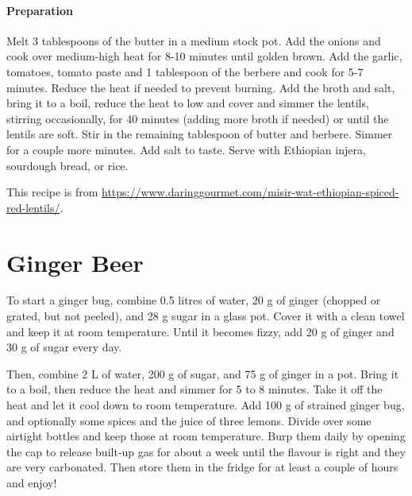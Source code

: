\paragraph{Preparation}
Melt 3 tablespoons of the butter in a medium stock pot.  Add the onions and cook over medium-high heat for 8-10 minutes until golden brown.  
Add the garlic, tomatoes, tomato paste and 1 tablespoon of the berbere and cook for 5-7 minutes. Reduce the heat if needed to prevent burning.
Add the broth and salt, bring it to a boil, reduce the heat to low and cover and simmer the lentils, stirring occasionally, for 40 minutes (adding more broth if needed) or until the lentils are soft.
Stir in the remaining tablespoon of butter and berbere. Simmer for a couple more minutes. Add salt to taste.
Serve with Ethiopian injera, sourdough bread, or rice.

This recipe is from \url{https://www.daringgourmet.com/misir-wat-ethiopian-spiced-red-lentils/}.

\section*{Ginger Beer}

To start a ginger bug, combine 0.5 litres of water, 20 g of ginger (chopped or grated, but not peeled), and 28 g sugar in a glass pot. Cover it with a clean towel and keep it at room temperature. Until it becomes fizzy, add 20 g of ginger and 30 g of sugar every day.

Then, combine 2 L of water, 200 g of sugar, and 75 g of ginger in a pot. Bring it to a boil, then reduce the heat and simmer for 5 to 8 minutes. Take it off the heat and let it cool down to room temperature. Add 100 g of strained ginger bug, and optionally some spices and the juice of three lemons. Divide over some airtight bottles and keep those at room temperature. Burp them daily by opening the cap to release built-up gas for about a week until the flavour is right and they are very carbonated. Then store them in the fridge for at least a couple of hours and enjoy!
